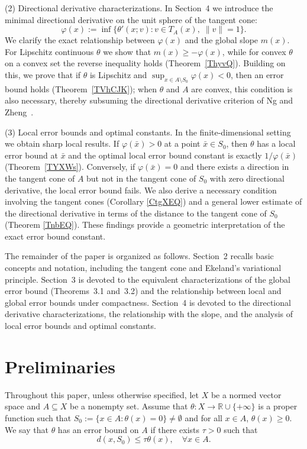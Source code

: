 \documentclass[11pt]{article}
\begin{document}
(2) Directional derivative characterizations.  In Section~4 we introduce the minimal directional derivative on the unit sphere of the tangent cone:
\[
\varphi(x) := \inf\bigl\{ \theta'(x;v) : v \in T_A(x),\; \|v\| = 1 \bigr\}.
\]
We clarify the exact relationship between \(\varphi(x)\) and the global slope \(m(x)\). For Lipschitz continuous \(\theta\) we show that \(m(x) \ge -\varphi(x)\), while for convex \(\theta\) on a convex set the reverse inequality holds (Theorem~\ref{ThyvQ}). Building on this, we prove that if \(\theta\) is Lipschitz and \(\sup_{x\in A\setminus S_0} \varphi(x) < 0\), then an error bound holds (Theorem~\ref{TVhCJK}); when \(\theta\) and \(A\) are convex, this condition is also necessary, thereby subsuming the directional derivative criterion of Ng and Zheng~\cite{NgZheng}.  

(3) Local error bounds and optimal constants.  In the finite-dimensional setting we obtain sharp local results. If \(\varphi(\bar x) > 0\) at a point \(\bar x \in S_0\), then \(\theta\) has a local error bound at \(\bar x\) and the optimal local error bound constant is exactly \(1/\varphi(\bar x)\) (Theorem~\ref{TYXWs}). Conversely, if \(\varphi(\bar x) = 0\) and there exists a direction in the tangent cone of \(A\) but not in the tangent cone of \(S_0\) with zero directional derivative, the local error bound fails. We also derive a necessary condition involving the tangent cones (Corollary  \ref{CtgXEQ}) and a general lower estimate of the directional derivative in terms of the distance to the tangent cone of \(S_0\) (Theorem \ref{TnbEQ}). These findings  provide a geometric interpretation of the exact error bound constant.

The remainder of the paper is organized as follows. Section~2 recalls basic concepts and notation, including the tangent cone and Ekeland's variational principle. Section~3 is devoted to the equivalent characterizations of the global error bound (Theorems~3.1 and~3.2) and the relationship between local and global error bounds under compactness.
Section~4 is devoted to the directional derivative characterizations, the relationship with the slope, and the analysis of local error bounds and optimal constants.

 
 
  
\section{Preliminaries}
Throughout this paper, unless otherwise specified,    let \( X \) be a   normed
vector space    and   \( A \subseteq X \) be a nonempty set.    Assume that   \( \theta : X \to \mathbb{R} \cup \{+\infty\} \) is  a proper function such that \( S_0 := \{ x \in A : \theta(x) = 0 \} \neq \emptyset \) and for all \( x \in A \), \( \theta(x) \geq 0 \). We say that \( \theta \) has an error bound on \( A \) if there exists \( \tau > 0 \) such that
\begin{equation}\label{EWJ2}
	d (x, S_0) \leq \tau \theta(x), \quad \forall x \in A.
\end{equation}
\end{document}
